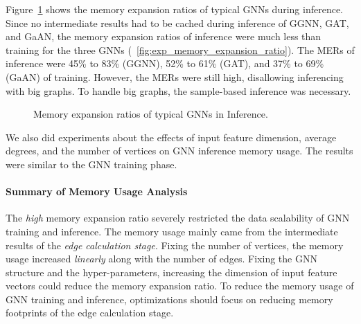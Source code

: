 Figure~\ref{fig:memory_usage_analysis} shows the memory expansion ratios of typical GNNs during inference.
%
Since no intermediate results had to be cached during inference of GGNN, GAT, and GaAN,
the memory expansion ratios of inference were much less than training for the three GNNs (\figurename~\ref{fig:exp_memory_expansion_ratio}).
%
The MERs of inference were 45\% to 83\% (GGNN), 52\% to 61\% (GAT), and 37\% to 69\% (GaAN) of training.
%
However, the MERs were still high, disallowing inferencing with big graphs.
%
To handle big graphs, the sample-based inference was necessary.

\begin{figure}[H]
   \centering
   \caption{Memory expansion ratios of typical GNNs in Inference.}
   \label{fig:memory_usage_analysis}
\end{figure}

%
We also did experiments about the effects of input feature dimension, average degrees, and the number of vertices on GNN inference memory usage.
%
The results were similar to the GNN training phase.
%

\paragraph{Summary of Memory Usage Analysis}
%
The \emph{high} memory expansion ratio severely restricted the data scalability of GNN training and inference.
%
The memory usage mainly came from the intermediate results of the \emph{edge calculation stage}.
%
Fixing the number of vertices, the memory usage increased \emph{linearly} along with the number of edges.
%
Fixing the GNN structure and the hyper-parameters, increasing the dimension of input feature vectors could reduce the memory expansion ratio.
%
To reduce the memory usage of GNN training and inference, optimizations should focus on reducing memory footprints of the edge calculation stage.


